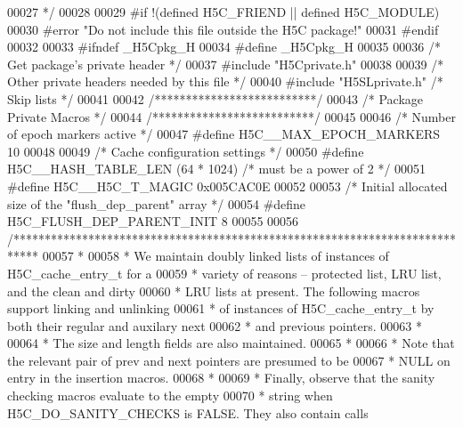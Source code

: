 \begin{DoxyCode}
00027 \textcolor{comment}{ */}
00028 
00029 \textcolor{preprocessor}{#if !(defined H5C\_FRIEND || defined H5C\_MODULE)}
00030 \textcolor{preprocessor}{#error "Do not include this file outside the H5C package!"}
00031 \textcolor{preprocessor}{#endif}
00032 
00033 \textcolor{preprocessor}{#ifndef \_H5Cpkg\_H}
00034 \textcolor{preprocessor}{#define \_H5Cpkg\_H}
00035 
00036 \textcolor{comment}{/* Get package's private header */}
00037 \textcolor{preprocessor}{#include "H5Cprivate.h"}
00038 
00039 \textcolor{comment}{/* Other private headers needed by this file */}
00040 \textcolor{preprocessor}{#include "H5SLprivate.h"}        \textcolor{comment}{/* Skip lists */}
00041 
00042 \textcolor{comment}{/**************************/}
00043 \textcolor{comment}{/* Package Private Macros */}
00044 \textcolor{comment}{/**************************/}
00045 
00046 \textcolor{comment}{/* Number of epoch markers active */}
00047 \textcolor{preprocessor}{#define H5C\_\_MAX\_EPOCH\_MARKERS                  10}
00048 
00049 \textcolor{comment}{/* Cache configuration settings */}
00050 \textcolor{preprocessor}{#define H5C\_\_HASH\_TABLE\_LEN     (64 * 1024) }\textcolor{comment}{/* must be a power of 2 */}\textcolor{preprocessor}{}
00051 \textcolor{preprocessor}{#define H5C\_\_H5C\_T\_MAGIC    0x005CAC0E}
00052 
00053 \textcolor{comment}{/* Initial allocated size of the "flush\_dep\_parent" array */}
00054 \textcolor{preprocessor}{#define H5C\_FLUSH\_DEP\_PARENT\_INIT 8}
00055 
00056 \textcolor{comment}{/****************************************************************************}
00057 \textcolor{comment}{ *}
00058 \textcolor{comment}{ * We maintain doubly linked lists of instances of H5C\_cache\_entry\_t for a}
00059 \textcolor{comment}{ * variety of reasons -- protected list, LRU list, and the clean and dirty}
00060 \textcolor{comment}{ * LRU lists at present.  The following macros support linking and unlinking}
00061 \textcolor{comment}{ * of instances of H5C\_cache\_entry\_t by both their regular and auxilary next}
00062 \textcolor{comment}{ * and previous pointers.}
00063 \textcolor{comment}{ *}
00064 \textcolor{comment}{ * The size and length fields are also maintained.}
00065 \textcolor{comment}{ *}
00066 \textcolor{comment}{ * Note that the relevant pair of prev and next pointers are presumed to be}
00067 \textcolor{comment}{ * NULL on entry in the insertion macros.}
00068 \textcolor{comment}{ *}
00069 \textcolor{comment}{ * Finally, observe that the sanity checking macros evaluate to the empty}
00070 \textcolor{comment}{ * string when H5C\_DO\_SANITY\_CHECKS is FALSE.  They also contain calls}

\end{DoxyCode}
